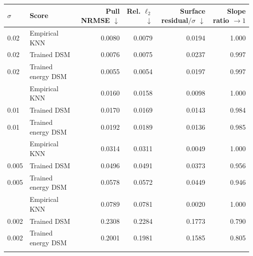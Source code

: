 \begin{tabular}{llrrrr}
\toprule
$\sigma$ & Score & Pull NRMSE $\downarrow$ & Rel. $\ell_2$ $\downarrow$ & Surface residual$/\sigma$ $\downarrow$ & Slope ratio $\to 1$ \\
\midrule
0.02 & Empirical KNN & 0.0080 & 0.0079 & 0.0194 & 1.000 \\
0.02 & Trained DSM & 0.0076 & 0.0075 & 0.0237 & 0.997 \\
0.02 & Trained energy DSM & 0.0055 & 0.0054 & 0.0197 & 0.997 \\
\addlinespace
0.01 & Empirical KNN & 0.0160 & 0.0158 & 0.0098 & 1.000 \\
0.01 & Trained DSM & 0.0170 & 0.0169 & 0.0143 & 0.984 \\
0.01 & Trained energy DSM & 0.0192 & 0.0189 & 0.0136 & 0.985 \\
\addlinespace
0.005 & Empirical KNN & 0.0314 & 0.0311 & 0.0049 & 1.000 \\
0.005 & Trained DSM & 0.0496 & 0.0491 & 0.0373 & 0.956 \\
0.005 & Trained energy DSM & 0.0578 & 0.0572 & 0.0449 & 0.946 \\
\addlinespace
0.002 & Empirical KNN & 0.0789 & 0.0781 & 0.0020 & 1.000 \\
0.002 & Trained DSM & 0.2308 & 0.2284 & 0.1773 & 0.790 \\
0.002 & Trained energy DSM & 0.2001 & 0.1981 & 0.1585 & 0.805 \\
\addlinespace
\bottomrule
\end{tabular}
